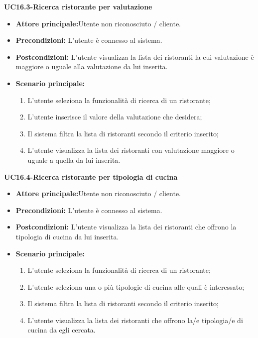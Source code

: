 \textbf{UC16.3-Ricerca ristorante per valutazione}
\begin{itemize}
\item \textbf{Attore principale:}Utente non riconosciuto / cliente.
\item \textbf{Precondizioni:} L'utente è connesso al sistema.
\item \textbf{Postcondizioni:} L'utente visualizza la lista dei ristoranti la cui valutazione è maggiore o uguale alla
valutazione da lui inserita.
\item \textbf{Scenario principale:}
\begin{enumerate}
    \item L'utente seleziona la funzionalità di ricerca di un ristorante;
    \item L'utente inserisce il valore della valutazione che desidera;
    \item Il sistema filtra la lista di ristoranti secondo il criterio inserito;
    \item L'utente visualizza la lista dei ristoranti con valutazione maggiore o uguale a quella da lui inserita.
\end{enumerate}
\end{itemize}

\textbf{UC16.4-Ricerca ristorante per tipologia di cucina}
\begin{itemize}
\item \textbf{Attore principale:}Utente non riconosciuto / cliente.
\item \textbf{Precondizioni:} L'utente è connesso al sistema.
\item \textbf{Postcondizioni:} L'utente visualizza la lista dei ristoranti che offrono la tipologia di cucina
da lui inserita.
\item \textbf{Scenario principale:}
\begin{enumerate}
    \item L'utente seleziona la funzionalità di ricerca di un ristorante;
    \item L'utente seleziona una o più tipologie di cucina alle quali è interessato;
    \item Il sistema filtra la lista di ristoranti secondo il criterio inserito;
    \item L'utente visualizza la lista dei ristoranti che offrono la/e tipologia/e di cucina da egli cercata.
\end{enumerate}
\end{itemize}

